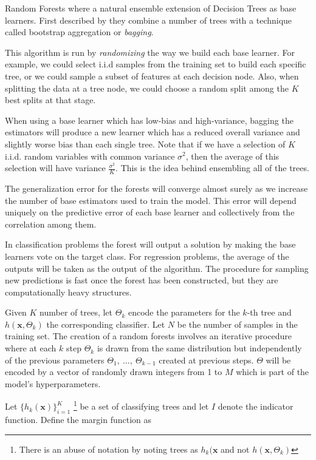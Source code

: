\documentclass{article}%
\theoremstyle{definition}
\begin{document}
Random Forests where a natural ensemble extension of Decision Trees as base learners. First described by \cite{HoFirstRandomForest} they combine a number of trees with a technique called bootstrap aggregation or \textit{bagging}. 

This algorithm is run by \textit{randomizing } the way we build each base learner. For example, we could select i.i.d samples from the training set to build each specific tree, or we could sample a subset of features at each decision node. Also, when splitting the data at a tree node, we could choose a random split among the $K$ best splits at that stage.
 
When using a base learner which has low-bias and high-variance, bagging the estimators will produce a new learner which has a reduced overall variance and slightly worse bias than each single tree. Note that if we have a selection of $K$ i.i.d. random variables with common variance $\sigma^2$, then the average of this selection will have variance $\frac{\sigma^2}{K}$. This is the idea behind ensembling all of the trees.


The generalization error for the forests will converge almost surely as we increase the number of base estimators used to train the model. This error will depend uniquely on the predictive error of each base learner and collectively from the correlation among them.

In classification problems the forest will output a solution by making the base learners vote on the  target class. For regression problems, the average of the outputs will be taken as the output of the algorithm. The procedure for sampling new predictions is fast once the forest has been constructed, but they are computationally heavy structures.

Given $K$ number of trees, let $\Theta_k$ encode the parameters for the $k$-th tree and $h(\textbf{x},\Theta_k)$ the corresponding classifier. Let $N$ be the number of samples in the training set. The creation of a random forests involves an iterative procedure where at each $k$ step $\Theta_k$ is drawn from the same distribution but independently of the previous parameters $\Theta_1, \ ..., \ \Theta_{k-1}$ created at previous steps. $\Theta$ will be encoded by a vector of randomly drawn integers from 1 to $M$ which is part of the model's hyperparameters.

Let $\{h_k(\textbf{x})\}_{i=1}^K$  \footnote{There is an abuse of notation by noting trees as $h_k(\textbf{x}$ and not $h(\textbf{x}, \Theta_k)$ } be a set of classifying trees and let $I$ denote the indicator function.  Define the margin function as
\end{document}
